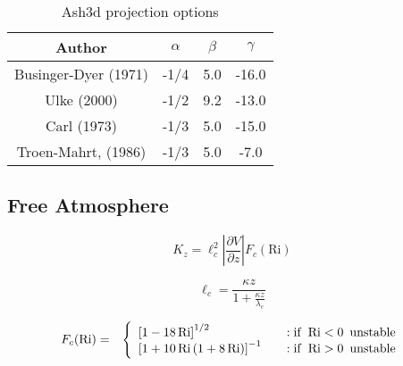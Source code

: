 \small
\begin{table}[htbp]
\begin{center}
\begin{tabular}{| c | c | c | c |}
\hline
Author & $\alpha$ & $\beta$ & $\gamma$\\
\hline
Businger-Dyer (1971)     & -1/4 & 5.0 & -16.0 \\
Ulke (2000)                & -1/2 & 9.2 & -13.0 \\
Carl (1973)                & -1/3 & 5.0 & -15.0 \\
Troen-Mahrt, (1986)            & -1/3 & 5.0 & -7.0  \\
\hline
\end{tabular}
\caption{\label{tab:ProjOpt}Ash3d projection options}
\end{center}
\end{table}
\normalsize



\subsection{Free Atmosphere}

\begin{equation}
K_z = \ell_c^2 \left| \frac{\partial V}{\partial z} \right|  F_c(\mathrm{Ri})
\end{equation}

\begin{equation}
\ell_c = \frac{\kappa z}{1+ \frac{\kappa z}{\lambda_c}}
\end{equation}


\begin{eqnarray}\label{EqPhiB}
F_c(\mathrm{Ri}) &=& \left\{ \begin{array} {l@{\quad \quad}l}
 \left[ 1 -18 \, \mathrm{Ri} \right]^{1/2}                         &: \mathrm{if}\,\,\, \mathrm{Ri} < 0 \,\,\, \mathrm{unstable} \\
 \left[ 1+ 10 \, \mathrm{Ri} \, (1+8 \, \mathrm{Ri}) \right]^{-1}  &: \mathrm{if}\,\,\, \mathrm{Ri} > 0 \,\,\, \mathrm{unstable}
\end{array}
\right.
\end{eqnarray}













